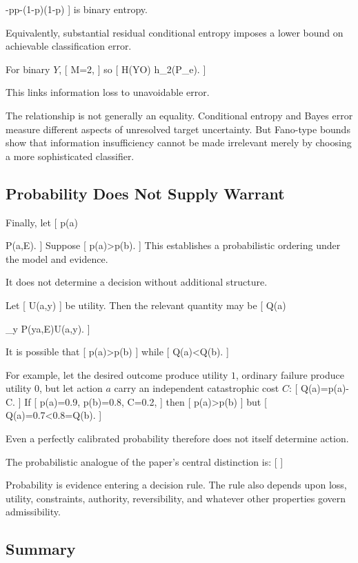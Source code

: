 \documentclass[11pt]{article}
\begin{document}
-p\log p-(1-p)\log(1-p)
]
is binary entropy.

Equivalently, substantial residual conditional entropy imposes a lower bound on achievable classification error.

For binary $Y$,
[
M=2,
]
so
[
H(Y\mid O)
\leq
h_2(P_e).
]

This links information loss to unavoidable error.

The relationship is not generally an equality. Conditional entropy and Bayes error measure different aspects of unresolved target uncertainty. But Fano-type bounds show that information insufficiency cannot be made irrelevant merely by choosing a more sophisticated classifier.

\subsection{Probability Does Not Supply Warrant}

Finally, let
[
p(a)

P(\mid a,E).
]
Suppose
[
p(a)>p(b).
]
This establishes a probabilistic ordering under the model and evidence.

It does not determine a decision without additional structure.

Let
[
U(a,y)
]
be utility. Then the relevant quantity may be
[
Q(a)

\sum_y
P(y\mid a,E)U(a,y).
]

It is possible that
[
p(a)>p(b)
]
while
[
Q(a)<Q(b).
]

For example, let the desired outcome produce utility $1$, ordinary failure produce utility $0$, but let action $a$ carry an independent catastrophic cost $C$:
[
Q(a)=p(a)-C.
]
If
[
p(a)=0.9,
\qquad
p(b)=0.8,
\qquad
C=0.2,
]
then
[
p(a)>p(b)
]
but
[
Q(a)=0.7<0.8=Q(b).
]

Even a perfectly calibrated probability therefore does not itself determine action.

The probabilistic analogue of the paper's central distinction is:
[
]

Probability is evidence entering a decision rule. The rule also depends upon loss, utility, constraints, authority, reversibility, and whatever other properties govern admissibility.

\subsection{Summary}
\end{document}
